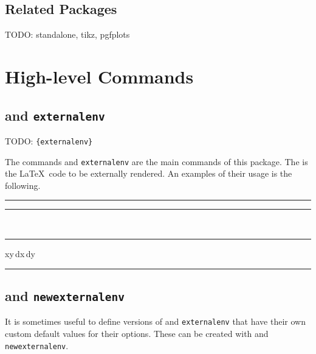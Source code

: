 \documentclass[10pt]{ltxdoc}
\newcommand{\env}[1]{\texttt{#1}}
\def\sz{%
  \rule{0.2em}{7pt}%
  \llap{\rule[8pt]{0.2em}{2pt}}%
}
\begin{document}
\subsection{Related Packages}
\label{subsec:Relatec Packages}

TODO: standalone, tikz, pgfplots

\section{High-level Commands}
\label{sec:High-level Commands}

\subsection{ and \env{externalenv}}
\label{subsec:external and externalenv}


TODO: \texttt{\{externalenv\}}

The commands  and \env{externalenv} are the main commands
of this package.
The  is the \LaTeX\ code to be externally rendered.
An examples of their usage is the following.

\begin{tcblisting}{}
\sz
{}%
\sz~\sz
\begin{externalenv}[preamble={\usepackage{amsmath}},math=inline]
  \iint xy\,dx\,dy
\end{externalenv}
\sz
\end{tcblisting}

\subsection{ and \env{newexternalenv}}
\label{subsec:newexternal and newexternalenv}



It is sometimes useful to define versions of  and
\env{externalenv} that have their own custom default values for their
options.
These can be created with  and \env{newexternalenv}.
\end{document}
